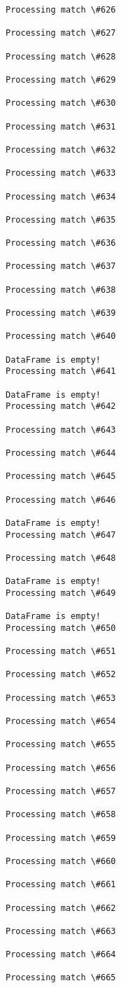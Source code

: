 \documentclass[11pt]{article}
\begin{document}
\begin{Verbatim}[commandchars=\\\{\}]
Processing match \#626

Processing match \#627

Processing match \#628

Processing match \#629

Processing match \#630

Processing match \#631

Processing match \#632

Processing match \#633

Processing match \#634

Processing match \#635

Processing match \#636

Processing match \#637

Processing match \#638

Processing match \#639

Processing match \#640

DataFrame is empty!
Processing match \#641

DataFrame is empty!
Processing match \#642

Processing match \#643

Processing match \#644

Processing match \#645

Processing match \#646

DataFrame is empty!
Processing match \#647

Processing match \#648

DataFrame is empty!
Processing match \#649

DataFrame is empty!
Processing match \#650

Processing match \#651

Processing match \#652

Processing match \#653

Processing match \#654

Processing match \#655

Processing match \#656

Processing match \#657

Processing match \#658

Processing match \#659

Processing match \#660

Processing match \#661

Processing match \#662

Processing match \#663

Processing match \#664

Processing match \#665


\end{Verbatim}
\end{document}
